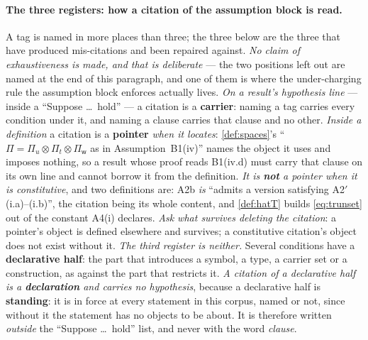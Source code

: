\paragraph{The three registers: how a citation of the assumption block is read.}
A tag is named in more places than three; the three below are the three that have produced mis-citations
and been repaired against. \emph{No claim of exhaustiveness is made, and that is deliberate} --- the
two positions left out are named at the end of this paragraph, and one of them is where the
under-charging rule the assumption block enforces actually lives.
\emph{On a result's hypothesis line} --- inside a ``Suppose \dots\ hold'' --- a citation is a
\textbf{carrier}: naming a tag carries every condition under it, and naming a clause carries that clause
and no other. \emph{Inside a definition} a citation is a \textbf{pointer} \emph{when it locates}:
\cref{def:spaces}'s ``$\Pi=\Pi_u\otimes\Pi_t\otimes\Pi_{\mathsf w}$ as in Assumption~B1(iv)'' names the
object it uses and imposes nothing, so a result whose proof reads B1(iv.d) must carry that clause on its
own line and cannot borrow it from the definition. \emph{It is \textbf{not} a pointer when it is
constitutive}, and two definitions are: A2b \emph{is} ``admits a version satisfying
A2$'$(i.a)--(i.b)'', the citation being its whole content, and \cref{def:hatT} builds
\eqref{eq:trunset} out of the constant A4(i) declares. \emph{Ask what survives deleting the citation}: a
pointer's object is defined elsewhere and survives; a constitutive citation's object does not exist
without it. \emph{The third register is neither.} Several conditions have a \textbf{declarative
half}: the part that introduces a symbol, a type, a carrier set or a construction, as against the part
that restricts it.
\emph{A citation of a declarative half is a \textbf{declaration} and carries no hypothesis}, because a
declarative half is \textbf{standing}: it is in force at every statement in this corpus, named or not,
since without it the statement has no objects to be about. It is therefore written \emph{outside} the
``Suppose \dots\ hold'' list, and never with the word \emph{clause}.

